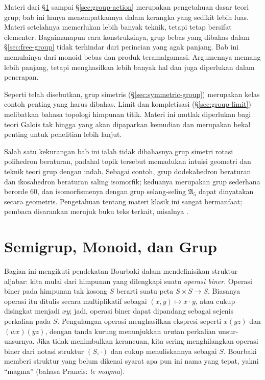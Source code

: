 \begin{wenxintishi}
	Materi dari \S\ref{sec:group-and-monoid} sampai \S\ref{sec:group-action} merupakan pengetahuan dasar teori grup; bab ini hanya menempatkannya dalam kerangka yang sedikit lebih luas. Materi setelahnya memerlukan lebih banyak teknik, tetapi tetap bersifat elementer. Bagaimanapun cara konstruksinya, grup bebas yang dibahas dalam \S\ref{sec:free-group} tidak terhindar dari perincian yang agak panjang. Bab ini memulainya dari monoid bebas dan produk teramalgamasi. Argumennya memang lebih panjang, tetapi menghasilkan lebih banyak hal dan juga diperlukan dalam penerapan.

	Seperti telah disebutkan, grup simetris (\S\ref{sec:symmetric-group}) merupakan kelas contoh penting yang harus dibahas. Limit dan kompletisasi (\S\ref{sec:group-limit}) melibatkan bahasa topologi himpunan titik. Materi ini mutlak diperlukan bagi teori Galois tak hingga yang akan dipaparkan kemudian dan merupakan bekal penting untuk penelitian lebih lanjut.

	Salah satu kekurangan bab ini ialah tidak dibahasnya grup simetri rotasi polihedron beraturan, padahal topik tersebut memadukan intuisi geometri dan teknik teori grup dengan indah. Sebagai contoh, grup dodekahedron beraturan dan ikosahedron beraturan saling isomorfik; keduanya merupakan grup sederhana berorde $60$, dan isomorfismenya dengan grup selang-seling $\mathfrak{A}_5$ dapat dinyatakan secara geometris. Pengetahuan tentang materi klasik ini sangat bermanfaat; pembaca disarankan merujuk buku teks terkait, misalnya \cite[Chapter 8]{Har00}.
\end{wenxintishi}

\section{Semigrup, Monoid, dan Grup}\label{sec:group-and-monoid}
Bagian ini mengikuti pendekatan Bourbaki \cite{Bou-Alg1} dalam mendefinisikan struktur aljabar: kita mulai dari himpunan yang dilengkapi suatu \emph{operasi biner}. Operasi biner pada himpunan tak kosong $S$ berarti suatu peta $S \times S \to S$. Biasanya operasi itu ditulis secara multiplikatif sebagai $(x, y) \mapsto x \cdot y$, atau cukup disingkat menjadi $xy$; jadi, operasi biner dapat dipandang sebagai sejenis perkalian pada $S$. Pengulangan operasi menghasilkan ekspresi seperti $x(yz)$ dan $(wx)(yz)$, dengan tanda kurung menunjukkan urutan perkalian unsur-unsurnya. Jika tidak menimbulkan kerancuan, kita sering menghilangkan operasi biner dari notasi struktur $(S, \cdot)$ dan cukup menuliskannya sebagai $S$. Bourbaki memberi struktur yang belum dikenai syarat apa pun ini nama yang tepat, yakni ``magma'' (bahasa Prancis: \emph{le magma}). 

